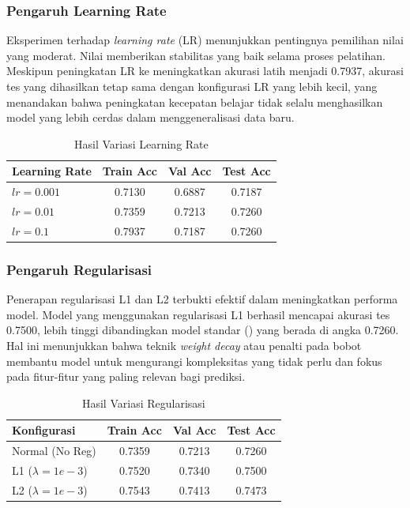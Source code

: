 \subsubsection{Pengaruh Learning Rate}

Eksperimen terhadap \textit{learning rate} (LR) menunjukkan pentingnya pemilihan nilai yang moderat. Nilai  memberikan stabilitas yang baik selama proses pelatihan. Meskipun peningkatan LR ke  meningkatkan akurasi latih menjadi 0.7937, akurasi tes yang dihasilkan tetap sama dengan konfigurasi LR yang lebih kecil, yang menandakan bahwa peningkatan kecepatan belajar tidak selalu menghasilkan model yang lebih cerdas dalam menggeneralisasi data baru.

\begin{table}[H]
\centering
\caption{Hasil Variasi Learning Rate}
\begin{tabular}{lccc}
\hline
\textbf{Learning Rate} & \textbf{Train Acc} & \textbf{Val Acc} & \textbf{Test Acc} \\
\hline
$lr=0.001$ & 0.7130 & 0.6887 & 0.7187 \\
$lr=0.01$  & 0.7359 & 0.7213 & 0.7260 \\
$lr=0.1$   & 0.7937 & 0.7187 & 0.7260 \\
\hline
\end{tabular}
\end{table}

\subsubsection{Pengaruh Regularisasi}

Penerapan regularisasi L1 dan L2 terbukti efektif dalam meningkatkan performa model. Model yang menggunakan regularisasi L1 berhasil mencapai akurasi tes 0.7500, lebih tinggi dibandingkan model standar () yang berada di angka 0.7260. Hal ini menunjukkan bahwa teknik \textit{weight decay} atau penalti pada bobot membantu model untuk mengurangi kompleksitas yang tidak perlu dan fokus pada fitur-fitur yang paling relevan bagi prediksi.

\begin{table}[H]
\centering
\caption{Hasil Variasi Regularisasi}
\begin{tabular}{lccc}
\hline
\textbf{Konfigurasi} & \textbf{Train Acc} & \textbf{Val Acc} & \textbf{Test Acc} \\
\hline
Normal (No Reg)   & 0.7359 & 0.7213 & 0.7260 \\
L1 ($\lambda=1e-3$) & 0.7520 & 0.7340 & 0.7500 \\
L2 ($\lambda=1e-3$) & 0.7543 & 0.7413 & 0.7473 \\
\hline
\end{tabular}
\end{table}

